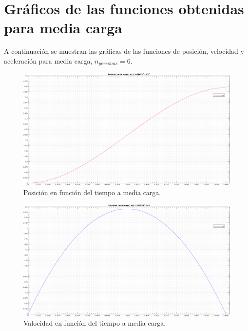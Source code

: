 \section{Gráficos de las funciones obtenidas para media carga}

A continuación se muestran las gráficas de las funciones de posición, velocidad y aceleración para media carga, $n_{personas} = 6$.


\begin{figure}[!h] %
\begin{center}
\includegraphics[width= \linewidth, keepaspectratio=true, angle=90]{img/grafico_funcion_x.png} %
\caption{\label{fig:fig_position_n_2} \footnotesize{Posición en función del tiempo a media carga.}}
\end{center}
\end{figure}

\clearpage

\begin{figure}[!h] %
\begin{center}
\includegraphics[width= \linewidth, keepaspectratio=true, angle=90]{img/grafico_funcion_v.png} %
\caption{\label{fig:fig_position_n_2} \footnotesize{Valocidad en función del tiempo a media carga.}}
\end{center}
\end{figure}

